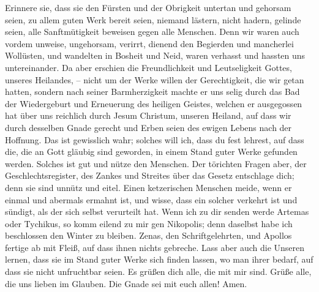  Erinnere sie, dass sie den Fürsten und der Obrigkeit
untertan und gehorsam seien, zu allem guten Werk bereit seien,
 niemand lästern, nicht hadern, gelinde seien, alle
Sanftmütigkeit beweisen gegen alle Menschen.  Denn wir
waren auch vordem unweise, ungehorsam, verirrt, dienend den Begierden
und mancherlei Wollüsten, und wandelten in Bosheit und Neid, waren
verhasst und hassten uns untereinander.  Da aber erschien
die Freundlichkeit und Leutseligkeit Gottes, unseres Heilandes, --
 nicht um der Werke willen der Gerechtigkeit, die wir
getan hatten, sondern nach seiner Barmherzigkeit machte er uns selig
durch das Bad der Wiedergeburt und Erneuerung des heiligen Geistes,
 welchen er ausgegossen hat über uns reichlich durch Jesum
Christum, unseren Heiland,  auf dass wir durch desselben
Gnade gerecht und Erben seien des ewigen Lebens nach der Hoffnung.
 Das ist gewisslich wahr; solches will ich, dass du fest
lehrest, auf dass die, die an Gott gläubig sind geworden, in einem Stand
guter Werke gefunden werden. Solches ist gut und nütze den Menschen.
 Der törichten Fragen aber, der Geschlechtsregister, des
Zankes und Streites über das Gesetz entschlage dich; denn sie sind
unnütz und eitel.  Einen ketzerischen Menschen meide,
wenn er einmal und abermals ermahnt ist,  und wisse, dass
ein solcher verkehrt ist und sündigt, als der sich selbst verurteilt
hat.  Wenn ich zu dir senden werde Artemas oder Tychikus,
so komm eilend zu mir gen Nikopolis; denn daselbst habe ich beschlossen
den Winter zu bleiben.  Zenas, den Schriftgelehrten, und
Apollos fertige ab mit Fleiß, auf dass ihnen nichts gebreche.
 Lass aber auch die Unseren lernen, dass sie im Stand
guter Werke sich finden lassen, wo man ihrer bedarf, auf dass sie nicht
unfruchtbar seien.  Es grüßen dich alle, die mit mir
sind. Grüße alle, die uns lieben im Glauben. Die Gnade sei mit euch
allen! Amen.
